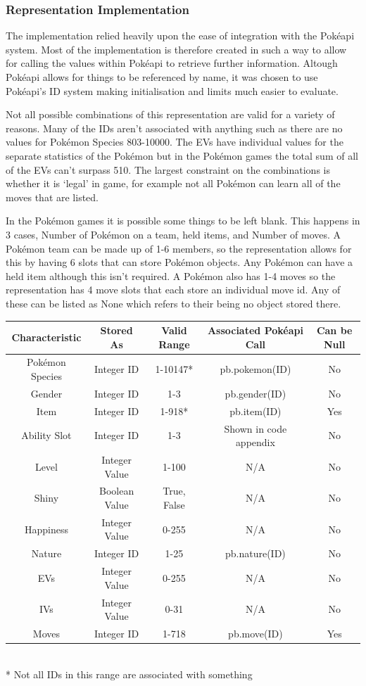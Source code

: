\documentclass[a4paper]{article}
\newcommand{\Pokemon}{Pok\'{e}mon}
\newcommand{\Pokeapi}{Pok\'{e}api}
\begin{document}
\subsubsection{Representation Implementation}
\par
The implementation relied heavily upon the ease of integration with the \Pokeapi{} system.
Most of the implementation is therefore created in such a way to allow for calling the values within \Pokeapi{} to retrieve further information.
Altough \Pokeapi{} allows for things to be referenced by name, it was chosen to use \Pokeapi{}'s ID system making initialisation and limits much easier to evaluate.
\par
Not all possible combinations of this representation are valid for a variety of reasons.
Many of the IDs aren't associated with anything such as there are no values for \Pokemon{} Species 803-10000.
The EVs have individual values for the separate statistics of the \Pokemon{} but in the \Pokemon{} games the total sum of all of the EVs can't surpass 510.
The largest constraint on the combinations is whether it is `legal' in game, for example not all \Pokemon{} can learn all of the moves that are listed.
\par
In the \Pokemon{} games it is possible some things to be left blank.
This happens in 3 cases, Number of \Pokemon{} on a team, held items, and Number of moves.
A \Pokemon{} team can be made up of 1-6 members, so the representation allows for this by having 6 slots that can store \Pokemon{} objects.
Any \Pokemon{} can have a held item although this isn't required.
A \Pokemon{} also has 1-4 moves so the representation has 4 move slots that each store an individual move id.
Any of these can be listed as None which refers to their being no object stored there.
\begin{center}
    \begin{tabular}{ c | c c c c }
        Characteristic & Stored As & Valid Range & Associated \Pokeapi{} Call & Can be Null \\
        \hline
        \Pokemon{} Species & Integer ID & 1-10147* & pb.pokemon(ID) & No \\
		Gender & Integer ID & 1-3 & pb.gender(ID) & No \\
		Item & Integer ID & 1-918* & pb.item(ID) & Yes \\
		Ability Slot & Integer ID & 1-3 & Shown in code appendix & No \\
		Level & Integer Value & 1-100 & N/A & No \\
		Shiny & Boolean Value & {True, False} & N/A & No \\
		Happiness & Integer Value & 0-255 & N/A & No \\
		Nature & Integer ID & 1-25 & pb.nature(ID) & No \\
		EVs & Integer Value & 0-255 & N/A & No \\
		IVs & Integer Value & 0-31 & N/A & No \\
		Moves & Integer ID & 1-718 & pb.move(ID) & Yes \\
    \end{tabular} \\
	\** Not all IDs in this range are associated with something
\end{center}
\end{document}
